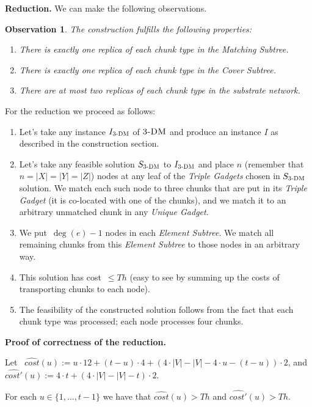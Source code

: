 \documentclass[preprint,12pt]{elsarticle}
\newcommand{\CostEstimOne}{\widehat{cost}}
\newcommand{\CostEstimTwo}{\widehat{cost'}}
\newcommand{\numNodes}{\ensuremath{|V|}}
\newcommand{\MatchSubtree}{{\emph{Matching Subtree}}}
\newcommand{\CoverSubtree}{{\emph{Cover Subtree}}}
\newcommand{\TripleGadget}{{\emph{Triple Gadget}}}
\newcommand{\TripleGadgets}{{\emph{Triple Gadgets}}}
\newcommand{\UnqGadget}{{\emph{Unique Gadget}}}
\newtheorem{obs}{Observation}
\newcommand{\TDM}{\textsc{3-DM}}
\newcommand{\Thr}{\ensuremath{Th}}
\begin{document}
\textbf{Reduction.}  We can make the following observations.

\begin{obs}
  The construction fulfills the following properties:
  \begin{enumerate}
    \item There is exactly one replica of each chunk type in the
    \MatchSubtree.

    \item There is exactly one replica of each chunk type in the
    \CoverSubtree.

    \item There are at most two replicas of each chunk type in the
    substrate network.
  \end{enumerate}
\end{obs}

For the reduction we proceed as follows:
\begin{enumerate}
  \item Let's take any instance $I_{\TDM}$ of $\TDM$ and produce an instance $I$ as described in the construction section.
  \item Let's take any feasible solution $S_{\TDM}$ to $I_{\TDM}$ and place $n$ (remember that~$n=|X|=|Y|=|Z|$) nodes at any leaf
  of the {\TripleGadgets} chosen in $S_{\TDM}$ solution. We
  match each such node to three chunks that are put in its
  {\TripleGadget} (it is co-located with one of the chunks), and we match it to an
  arbitrary unmatched chunk in any \UnqGadget.
  \item We put~$\deg(e)-1$ nodes in each \emph{Element Subtree}. We match all
  remaining chunks from this \emph{Element Subtree} to those nodes in an
  arbitrary way.
  \item This solution has cost~$\leq \Thr$ (easy to see by summing up the
  costs of transporting chunks to each node).
  \item The feasibility of the constructed solution follows from the
  fact that each chunk type was processed; each node processes four
  chunks.
\end{enumerate}

\textbf{Proof of correctness of the reduction.}

  Let
 ~$\CostEstimOne(u) := u \cdot 12 + (t-u)\cdot 4 + (4\cdot \numNodes -
  \numNodes - 4\cdot u - (t-u))\cdot 2$, and 
$\CostEstimTwo(u) := 4\cdot t + (4\cdot
\numNodes - \numNodes - t)\cdot 2$.

\begin{lemma}
  For each $u \in \{ 1, \ldots, t-1 \}$ we have that $\CostEstimOne(u) > \Thr$ and
  $\CostEstimTwo(u) > \Thr$.
  \label{lem:cost-estims}
\end{lemma}
\end{document}
